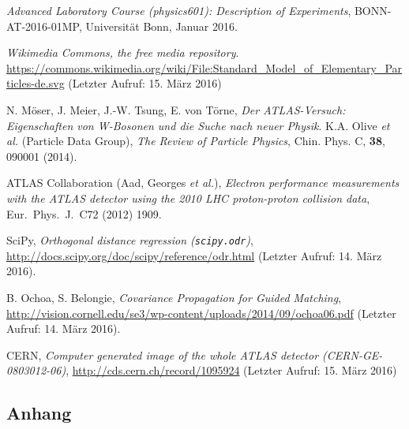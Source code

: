 \documentclass[11pt, a4paper]{article}
\numberwithin{equation}{section}
\begin{document}
\FloatBarrier
\vspace{\fill}
\begin{thebibliography}{19}
	\emph{Advanced Laboratory Course (physics601): Description of Experiments},
	BONN-AT-2016-01MP, Universität Bonn, Januar 2016.

	\emph{Wikimedia Commons, the free media repository}. \url{https://commons.wikimedia.org/wiki/File:Standard_Model_of_Elementary_Particles-de.svg} (Letzter Aufruf: 15. März 2016)
	
	N. Möser, J. Meier, J.-W. Tsung, E. von Törne,
	\emph{Der ATLAS-Versuch: Eigenschaften von W-Bosonen und die Suche nach neuer Physik}.
	K.A. Olive \textit{et al.} (Particle Data Group),
	\emph{The Review of Particle Physics},
	Chin. Phys. C, \textbf{38}, 090001 (2014).

	ATLAS Collaboration (Aad, Georges \textit{et al.}),
	\emph{Electron performance measurements with the ATLAS detector using the 2010 LHC proton-proton collision data},
	Eur.\ Phys.\ J.\ C72 (2012) 1909.

	SciPy,
	\emph{Orthogonal distance regression (\texttt{scipy.odr})},
	\url{http://docs.scipy.org/doc/scipy/reference/odr.html} (Letzter Aufruf: 14. März 2016).

	B. Ochoa, S. Belongie,
	\emph{Covariance Propagation for Guided Matching},
	\url{http://vision.cornell.edu/se3/wp-content/uploads/2014/09/ochoa06.pdf} (Letzter Aufruf: 14. März 2016).
	
	CERN, \emph{Computer generated image of the whole ATLAS detector (CERN-GE-0803012-06)}, \url{http://cds.cern.ch/record/1095924} (Letzter Aufruf: 15. März 2016)
\end{thebibliography}

\begin{appendix}
\newpage
\section{Anhang}


\end{appendix}
\end{document}
